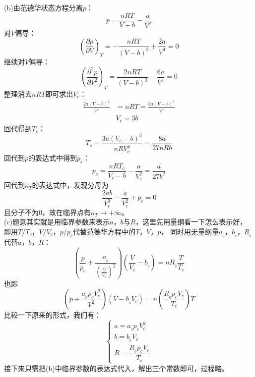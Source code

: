 \begin{solution}
    (b)由范德华状态方程分离$p$：
    \begin{equation*}
        p = \frac{nRT}{V-b}-\frac{a}{V^{2}}
    \end{equation*}
    对$V$偏导：
    \begin{equation*}
        \left(\frac{\partial p}{\partial V}\right)_{T} = -\frac{nRT}{(V-b)^{2}} + \frac{2a}{V^{3}} = 0
    \end{equation*}
    继续对$V$偏导：
    \begin{equation*}
        \left(\frac{\partial^{2} p}{\partial V^{2}}\right)_{T} = \frac{2nRT}{(V-b)^{3}} - \frac{6a}{V^{4}} = 0
    \end{equation*}
    整理消去$nRT$即可求出$V_c$：
    \begin{equation*}
        \begin{aligned}
            \frac{2a(V-b)^{2}}{V^{3}} & = nRT = \frac{3a(V-b)^{3}}{V^{4}} \\
                                      & V_c = 3b
        \end{aligned}
    \end{equation*}
    回代得到$T_c$：
    \begin{equation*}
        T_c = \frac{3a(V_{c}-b)^{3}}{nRV_{c}^{4}} = \frac{8a}{27nRb}
    \end{equation*}
    回代到$p$的表达式中得到$p_c$：
    \begin{equation*}
        p_c = \frac{nRT_c}{V_{c}-b}-\frac{a}{V_{c}^{2}} = \frac{a}{27b^{2}}
    \end{equation*}
    回代到$\kappa_T$的表达式中，发现分母为
    \begin{equation*}
        \frac{2ab}{V_{c}^{3}}-\frac{a}{V_{c}^{2}}+p_{c} = 0
    \end{equation*}
    且分子不为$0$，故在临界点有$\kappa_T\rightarrow +\infty$。
    \\

    (c)题意其实就是用临界参数来表示$a$，$b$与$R$，这里先用量纲看一下怎么表示好，
    即用$T/T_c$，$V/V_c$，$p/p_c$代替范德华方程中的$T$，$V$，$p$，
    同时用无量纲量$a_{_0}$，$b_{_0}$，$R_{_0}$代替$a$，$b$，$R$：
    \begin{equation*}
        (\frac{p}{p_c}+\frac{a_{_0}}{\left(\frac{V}{V_c}\right)^{2}})(\frac{V}{V_c}-b_{_0})=nR_{_0}\frac{T}{T_c}
    \end{equation*}
    也即
    \[(p+\frac{a_{_0}p_{c}V_{c}^2}{V^2})(V-b_{_0}V_c) = n(\frac{R_{_0}p_{c}V_{c}}{T_{c}})T\]
    比较一下原来的形式，我们有：
    \begin{equation*}
        \begin{cases}
            a = a_{_0}p_{c}V_{c}^2 \\
            b = b_{_0}V_c          \\
            R = \dfrac{R_{_0}p_{c}V_{c}}{T_{c}}
        \end{cases}
    \end{equation*}
    接下来只需把(b)中临界参数的表达式代入，解出三个常数即可，过程略。


\end{solution}
